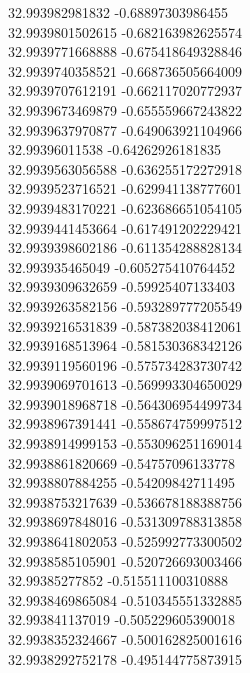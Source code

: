 {32.993982981832	-0.68897303986455\\
32.9939801502615	-0.682163982625574\\
32.9939771668888	-0.675418649328846\\
32.9939740358521	-0.668736505664009\\
32.9939707612191	-0.662117020772937\\
32.9939673469879	-0.655559667243822\\
32.9939637970877	-0.649063921104966\\
32.99396011538	-0.64262926181835\\
32.9939563056588	-0.636255172272918\\
32.9939523716521	-0.629941138777601\\
32.9939483170221	-0.623686651054105\\
32.9939441453664	-0.617491202229421\\
32.9939398602186	-0.611354288828134\\
32.993935465049	-0.605275410764452\\
32.9939309632659	-0.59925407133403\\
32.9939263582156	-0.593289777205549\\
32.9939216531839	-0.587382038412061\\
32.9939168513964	-0.581530368342126\\
32.9939119560196	-0.575734283730742\\
32.9939069701613	-0.569993304650029\\
32.9939018968718	-0.564306954499734\\
32.9938967391441	-0.558674759997512\\
32.9938914999153	-0.553096251169014\\
32.9938861820669	-0.54757096133778\\
32.9938807884255	-0.54209842711495\\
32.9938753217639	-0.536678188388756\\
32.9938697848016	-0.531309788313858\\
32.9938641802053	-0.525992773300502\\
32.9938585105901	-0.520726693003466\\
32.99385277852	-0.515511100310888\\
32.9938469865084	-0.510345551332885\\
32.993841137019	-0.505229605390018\\
32.9938352324667	-0.500162825001616\\
32.9938292752178	-0.495144775873915\\
}
